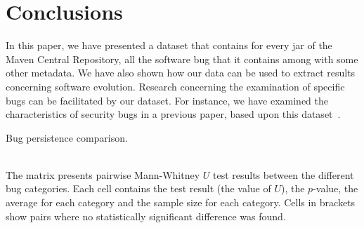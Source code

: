 \documentclass{sig-alternate}
\begin{document}
\section{Conclusions}
\label{sec:conc}

In this paper, we have presented a dataset that contains
for every {\sc jar} of the Maven Central Repository,
all the software bug that it contains among with some
other metadata. We have also shown how our data can be
used to extract results concerning software evolution.
Research concerning the examination of specific bugs
can be facilitated by our dataset. For instance,
we have examined the characteristics of security
bugs in a previous paper, based upon this dataset~\cite{MKLGS13}.



  

\begin{landscape}
  \begin{table}
    \setlength{\extrarowheight}{0.10cm}
    \caption{Bug persistence comparison.}
    \label{tbl:bug_persistence}
    \resizebox{0.95\columnwidth}{!}{
    }\\
    The matrix presents pairwise Mann-Whitney $U$ test results
    between the different bug categories. Each cell contains the test
    result (the value of $U$), the $p$-value, the average for each
    category and the sample size for each category. Cells in brackets show
    pairs where no statistically significant difference was found.
  \end{table}
\end{landscape}
\end{document}
